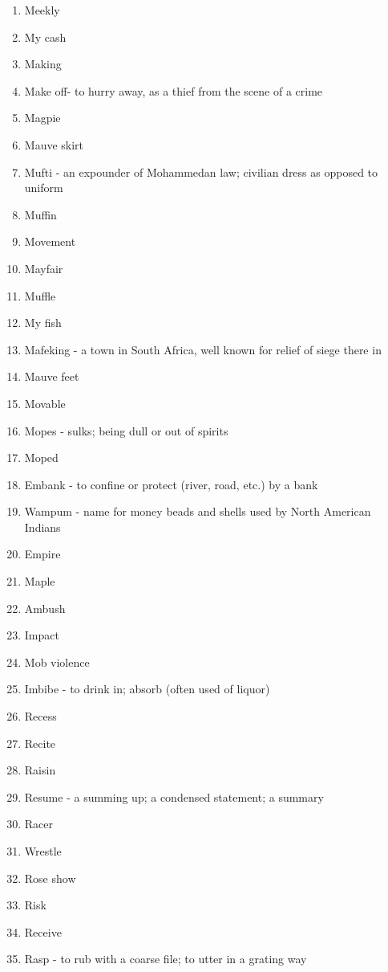 \begin{enumerate}
        \item Meekly
        \item My cash
        \item Making
        \item Make off- to hurry away, as a thief from the scene of a crime
        \item Magpie
        \item Mauve skirt
        \item Mufti - an expounder of Mohammedan law; civilian dress as opposed to uniform
        \item Muffin
        \item Movement
        \item Mayfair
        \item Muffle
        \item My fish
        \item Mafeking - a town in South Africa, well known for relief of siege there in
        \item Mauve feet
        \item Movable
        \item Mopes - sulks; being dull or out of spirits
        \item Moped
        \item Embank - to confine or protect (river, road, etc.) by a bank
        \item Wampum - name for money beads and shells used by North American Indians
        \item Empire
        \item Maple
        \item Ambush
        \item Impact
        \item Mob violence
        \item Imbibe - to drink in; absorb (often used of liquor)
        \item Recess
        \item Recite
        \item Raisin
        \item Resume - a summing up; a condensed statement; a summary
        \item Racer
        \item Wrestle
        \item Rose show
        \item Risk
        \item Receive
        \item Rasp - to rub with a coarse file; to utter in a grating way

\end{enumerate}
